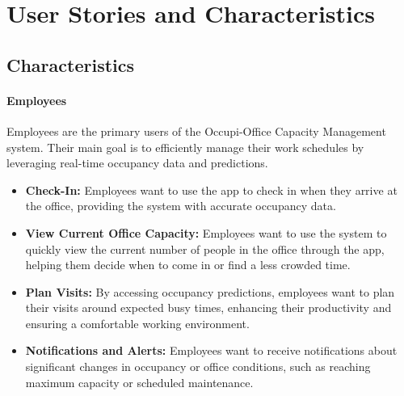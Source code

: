 \documentclass[11pt,a4paper]{article}
\begin{document}
\pagebreak

\section*{User Stories and Characteristics}

\subsection*{Characteristics}
\paragraph{Employees}
Employees are the primary users of the Occupi-Office Capacity Management system. Their main goal is to efficiently manage their work schedules by leveraging real-time occupancy data and predictions.
\begin{itemize}
    \item \textbf{Check-In:} Employees want to use the app to check in when they arrive at the office, providing the system with accurate occupancy data.
    \item \textbf{View Current Office Capacity:} Employees want to use the system to quickly view the current number of people in the office through the app, helping them decide when to come in or find a less crowded time.
    \item \textbf{Plan Visits:} By accessing occupancy predictions, employees want to plan their visits around expected busy times, enhancing their productivity and ensuring a comfortable working environment.
    \item \textbf{Notifications and Alerts:} Employees want to receive notifications about significant changes in occupancy or office conditions, such as reaching maximum capacity or scheduled maintenance.
\end{itemize}
\end{document}
